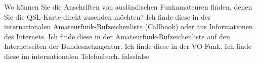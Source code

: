     {Wo können Sie die Anschriften von ausländischen Funkamateuren finden, denen Sie die QSL-Karte direkt zusenden möchten?}
    {Ich finde diese in der internationalen Amateurfunk-Rufzeichenliste (Callbook) oder aus Informationen des Internets.}
    {Ich finde diese in der Amateurfunk-Rufzeichenliste auf den Internetseiten der Bundesnetzagentur.}
    {Ich finde diese in der VO Funk.}
    {Ich finde diese im internationalen Telefonbuch.}
    {false}{false}